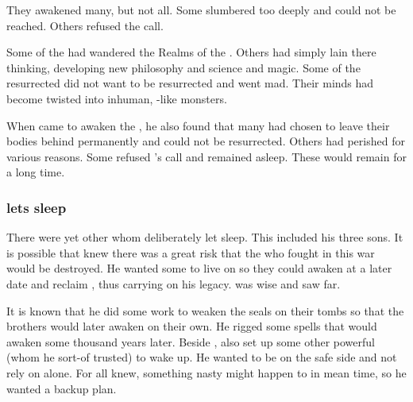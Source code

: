They awakened many, but not all.
Some slumbered too deeply and could not be reached.
Others refused the call.

Some of the \dragons had wandered the Realms of the \xss. 
Others had simply lain there thinking, developing new philosophy and science and magic.
Some of the resurrected \dragons did not want to be resurrected and went mad.
Their minds had become twisted into inhuman, \xs-like monsters.


When \Sethicus came to awaken the \dragons, he also found that many had chosen to leave their bodies behind permanently and could not be resurrected.
Others had perished for various reasons.
Some refused \Sethicus's call and remained asleep. 
These would remain  for a long time. 





\subsubsection{\Sethicus lets \Nexagglachel sleep}
There were yet other \dragons whom \Sethicus deliberately let sleep.
This included his three sons.
It is possible that \Sethicus knew there was a great risk that the \dragons who fought in this war would be destroyed. 
He wanted some \dragons to live on so they could awaken at a later date and reclaim \Miith, thus carrying on his legacy.
\Sethicus was wise and saw far.

It is known that he did some work to weaken the seals on their tombs so that the brothers would later awaken on their own.
He rigged some spells that would awaken \Nexagglachel some thousand years later.
Beside \Nexagglachel, \Sethicus also set up some other powerful \dragons (whom he sort-of trusted) to wake up. 
He wanted to be on the safe side and not rely on \Nexagglachel alone.
For all \Sethicus knew, something nasty might happen to \Nexagglachel in mean time, so he wanted a backup plan. 





